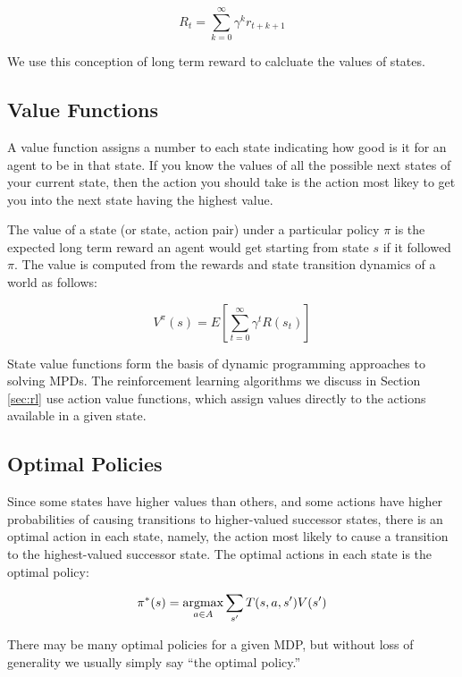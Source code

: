 \begin{equation}
R_t = \sum_{k=0}^{\infty} \gamma^k r_{t+k+1}
\end{equation}

We use this conception of long term reward to calcluate the values of states.


\subsection{Value Functions}

A value function assigns a number to each state indicating how good is it for an agent to be in that state. If you know the values of all the possible next states of your current state, then the action you should take is the action most likey to get you into the next state having the highest value.

The value of a state (or state, action pair) under a particular policy $\pi$ is the expected long term reward an agent would get starting from state $s$ if it followed $\pi$. The value is computed from the rewards and state transition dynamics of a world as follows:

\begin{equation}
V^\pi(s) = E \left [ \sum_{t=0}^{\infty} \gamma^t R(s_t) \right ]
\end{equation}

State value functions form the basis of dynamic programming approaches to solving MPDs. The reinforcement learning algorithms we discuss in Section \ref{sec:rl} use action value functions, which assign values directly to the actions available in a given state.

\subsection{Optimal Policies}

Since some states have higher values than others, and some actions have higher probabilities of causing transitions to higher-valued successor states, there is an optimal action in each state, namely, the action most likely to cause a transition to the highest-valued successor state. The optimal actions in each state is the optimal policy:

\begin{equation}
\pi^*(s) = \operatorname*{argmax}_{a \in A} \sum_{s'} T(s, a, s') V(s')
\end{equation}

There may be many optimal policies for a given MDP, but without loss of generality we usually simply say ``the optimal policy.''

